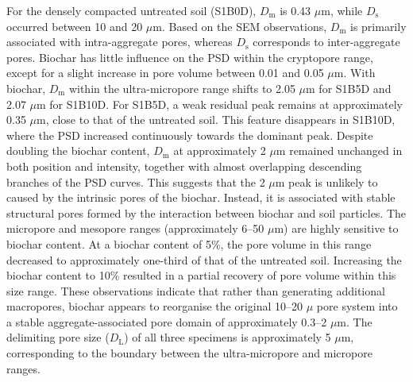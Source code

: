 For the densely compacted untreated soil (S1B0D), $D_{\mathrm{m}}$ is 0.43 $\mu$m, while $D_{\mathrm{s}}$ occurred between 10 and 20 $\mu$m. Based on the SEM observations, $D_{\mathrm{m}}$ is primarily associated with intra-aggregate pores, whereas $D_{\mathrm{s}}$ corresponds to inter-aggregate pores. Biochar has little influence on the \ac{PSD} within the cryptopore range, except for a slight increase in pore volume between 0.01 and 0.05 $\mu$m. With biochar, $D_{\mathrm{m}}$ within the ultra-micropore range shifts to 2.05 $\mu$m for S1B5D and 2.07 $\mu$m for S1B10D. For S1B5D, a weak residual peak remains at approximately 0.35 $\mu$m, close to that of the untreated soil. This feature disappears in S1B10D, where the \ac{PSD} increased continuously towards the dominant peak. Despite doubling the biochar content, $D_{\mathrm{m}}$ at approximately 2 $\mu$m remained unchanged in both position and intensity, together with almost overlapping descending branches of the \ac{PSD} curves. This suggests that the 2 $\mu$m peak is unlikely to caused by the intrinsic pores of the biochar. Instead, it is associated with stable structural pores formed by the interaction between biochar and soil particles. The micropore and mesopore ranges (approximately 6–50 $\mu$m) are highly sensitive to biochar content. At a biochar content of 5\%, the pore volume in this range decreased to approximately one-third of that of the untreated soil. Increasing the biochar content to 10\% resulted in a partial recovery of pore volume within this size range. These observations indicate that rather than generating additional macropores, biochar appears to reorganise the original 10–20 $\mu$ pore system into a stable aggregate-associated pore domain of approximately 0.3–2 $\mu$m. The delimiting pore size ($D_{\mathrm{L}}$) of all three specimens is approximately 5 $\mu$m, corresponding to the boundary between the ultra-micropore and micropore ranges.\par
